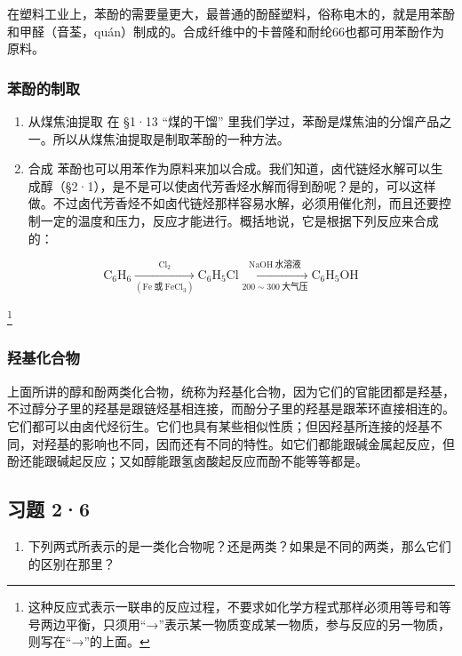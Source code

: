 在塑料工业上，苯酚的需要量更大，最普通的酚醛塑料，俗称电木的，就是用苯酚和甲醛（音荃，quán）制成的。合成纤维中的卡普隆和耐纶66也都可用苯酚作为原料。

\subsubsection{苯酚的制取}

\begin{enumerate}
\item
  从煤焦油提取 在 §1·13 ``煤的干馏''
  里我们学过，苯酚是煤焦油的分馏产品之一。所以从煤焦油提取是制取苯酚的一种方法。
\item
  合成
  苯酚也可以用苯作为原料来加以合成。我们知道，卤代链烃水解可以生成醇（§2·1），是不是可以使卤代芳香烃水解而得到酚呢？是的，可以这样做。不过卤代芳香烃不如卤代链烃那样容易水解，必须用催化剂，而且还要控制一定的温度和压力，反应才能进行。概括地说，它是根据下列反应来合成的：
\end{enumerate}

\[
\mathrm{C}_{6}\mathrm{H}_{6}
\xrightarrow[(\mathrm{Fe}\ \text{或}\ \mathrm{FeCl}_{3})]{\mathrm{Cl}_{2}}
\mathrm{C}_{6}\mathrm{H}_{5}\mathrm{Cl}
\xrightarrow[200\sim300\ \text{大气压}]{\mathrm{NaOH}\ \text{水溶液}}
\mathrm{C}_{6}\mathrm{H}_{5}\mathrm{OH}
\]

\footnote{这种反应式表示一联串的反应过程，不要求如化学方程式那样必须用等号和等号两边平衡，只须用``→''表示某一物质变成某一物质，参与反应的另一物质，则写在``→''的上面。}

\subsubsection{羟基化合物}

上面所讲的醇和酚两类化合物，统称为羟基化合物，因为它们的官能团都是羟基，不过醇分子里的羟基是跟链烃基相连接，而酚分子里的羟基是跟苯环直接相连的。它们都可以由卤代烃衍生。它们也具有某些相似性质；但因羟基所连接的烃基不同，对羟基的影响也不同，因而还有不同的特性。如它们都能跟碱金属起反应，但酚还能跟碱起反应；又如醇能跟氢卤酸起反应而酚不能等等都是。

\subsection{习题 2·6}

\begin{enumerate}
\item
  下列两式所表示的是一类化合物呢？还是两类？如果是不同的两类，那么它们的区别在那里？
\end{enumerate}


